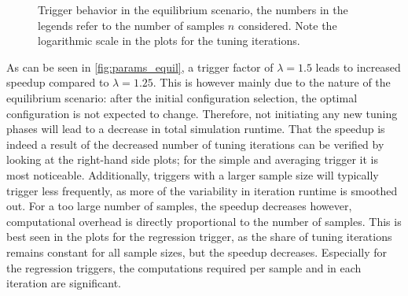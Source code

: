 \begin{figure}[htpb]
\begin{subfigure}{0.45\textwidth}
	\end{subfigure}%
	\caption{Trigger behavior in the equilibrium scenario, the numbers in the legends refer to the number of samples $n$ considered. Note the logarithmic scale in the plots for the tuning iterations.}
	\label{fig:params_equil}
\end{figure}

As can be seen in \autoref{fig:params_equil}, a trigger factor of $\lambda=1.5$ leads to increased speedup compared to $\lambda=1.25$. This is however mainly due to the nature of the equilibrium scenario: after the initial configuration selection, the optimal configuration is not expected to change.
Therefore, not initiating any new tuning phases will lead to a decrease in total simulation runtime. That the speedup is indeed  a result of the decreased number of tuning iterations can be verified by looking at the right-hand side plots; for the simple and averaging trigger it is most noticeable.
Additionally, triggers with a larger sample size will typically trigger less frequently, as more of the variability in iteration runtime is smoothed out. For a too large number of samples, the speedup decreases however, computational overhead is directly proportional to the number of samples. This is best seen in the plots for the regression trigger, as the share of tuning iterations remains constant for all sample sizes, but the speedup decreases. Especially for the regression triggers, the computations required per sample and in each iteration are significant.

